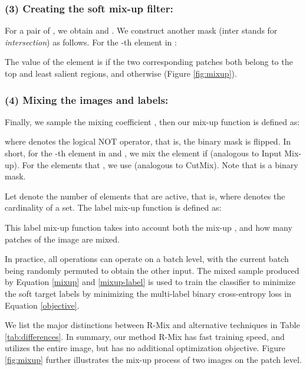 \documentclass[letterpaper]{article} \usepackage[submission]{aaai23}  \usepackage{times}  \usepackage{helvet}  \usepackage{courier}  \usepackage[hyphens]{url}  \usepackage{graphicx} \urlstyle{rm} \def\UrlFont{\rm}  \usepackage{natbib}  \usepackage{caption} \frenchspacing  \setlength{\pdfpagewidth}{8.5in} \setlength{\pdfpageheight}{11in}
\newcommand{\mixup}{Input Mix-up}
\newcommand{\cutmix}{{CutMix}}
\newcommand{\rrlmix}{{R-Mix}}
\begin{document}
\subsubsection{(3) Creating the soft mix-up filter:} For a pair of , we obtain  and . We construct another mask  (inter stands for \textit{intersection}) as follows. For the -th element in :



The value of the element is  if the two corresponding patches both belong to the top and least salient regions, and  otherwise (Figure \ref{fig:mixup}).


\subsubsection{(4) Mixing the images and labels:} Finally, we sample the mixing coefficient , then our mix-up function is defined as:

where  denotes the logical NOT operator, that is, the binary mask is flipped. In short, for the -th element in  and , we mix the element if  (analogous to \mixup{}). For the elements that , we use  (analogous to \cutmix{}). Note that  is a binary mask.

Let  denote the number of elements that are active, that is,  where  denotes the cardinality of a set. The label mix-up function is defined as:


This label mix-up function takes into account both the mix-up , and how many patches of the image are mixed. 


In practice, all operations can operate on a batch level, with the current batch being randomly permuted to obtain the other input. The mixed sample produced by Equation \ref{mixup} and \ref{mixup-label} is used to train the classifier  to minimize the soft target labels by minimizing the multi-label binary cross-entropy loss in Equation \ref{objective}.


We list the major distinctions between \rrlmix{} and alternative techniques in Table \ref{tab:differences}. In summary, our method \rrlmix{} has fast training speed, and utilizes the entire image, but has no additional optimization objective. Figure \ref{fig:mixup} further illustrates the mix-up process of two images on the patch level.
\end{document}
